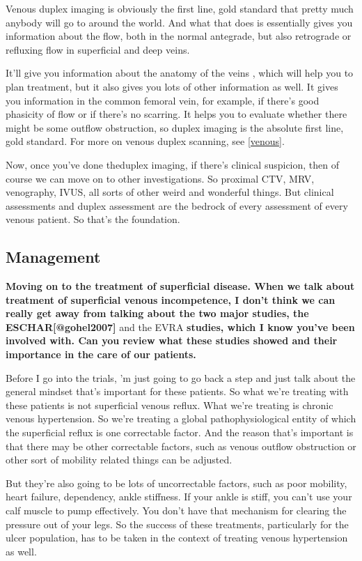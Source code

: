 \documentclass[
]{book}
\begin{document}
Venous duplex imaging is obviously the first line, gold standard that
pretty much anybody will go to around the world. And what that does is
essentially gives you information about the flow, both in the normal
antegrade, but also retrograde or refluxing flow in superficial and deep
veins.

It'll give you information about the anatomy of the veins , which will
help you to plan treatment, but it also gives you lots of other
information as well. It gives you information in the common femoral
vein, for example, if there's good phasicity of flow or if there's no
scarring. It helps you to evaluate whether there might be some outflow
obstruction, so duplex imaging is the absolute first line, gold
standard. For more on venous duplex scanning, see \ref{venous}.

Now, once you've done theduplex imaging, if there's clinical suspicion,
then of course we can move on to other investigations. So proximal CTV,
MRV, venography, IVUS, all sorts of other weird and wonderful things.
But clinical assessments and duplex assessment are the bedrock of every
assessment of every venous patient. So that's the foundation.

\hypertarget{management-29}{%
\subsection{Management}\label{management-29}}

\textbf{Moving on to the treatment of superficial disease. When we talk about
treatment of superficial venous incompetence, I don't think we can
really get away from talking about the two major studies, the
ESCHAR{[}@gohel2007{]}} and the EVRA\citep{gohel2018} \textbf{studies, which I know
you've been involved with. Can you review what these studies showed and
their importance in the care of our patients.}

Before I go into the trials, 'm just going to go back a step and just
talk about the general mindset that's important for these patients. So
what we're treating with these patients is not superficial venous
reflux. What we're treating is chronic venous hypertension. So we're
treating a global pathophysiological entity of which the superficial
reflux is one correctable factor. And the reason that's important is
that there may be other correctable factors, such as venous outflow
obstruction or other sort of mobility related things can be adjusted.

But they're also going to be lots of uncorrectable factors, such as poor
mobility, heart failure, dependency, ankle stiffness. If your ankle is
stiff, you can't use your calf muscle to pump effectively. You don't
have that mechanism for clearing the pressure out of your legs. So the
success of these treatments, particularly for the ulcer population, has
to be taken in the context of treating venous hypertension as well.
\end{document}
